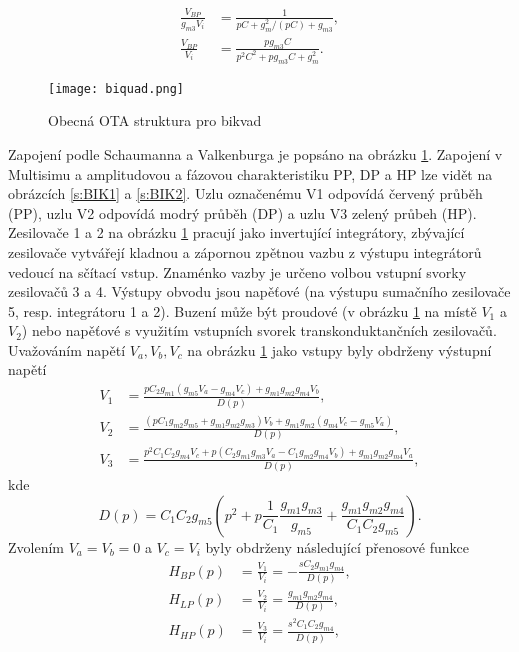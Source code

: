 \begin{align}
\frac{V_{BP}}{g_{m3}V_i} &= \frac{1}{pC + g_m^2/(pC) + g_{m3}},\\
\frac{V_{BP}}{V_i} &= \frac{pg_{m3}C}{p^2C^2 + pg_{m3}C + g_m^2}.
\end{align}
\begin{figure}[h]
\centering
\texttt{[image: biquad.png]}
\caption[Obecná OTA struktura pro bikvad]{Obecná OTA struktura pro bikvad \label{s:BIK}}
\end{figure}
\noindent Zapojení podle Schaumanna a Valkenburga \cite{18} je popsáno na obrázku \ref{s:BIK}. Zapojení v Multisimu a amplitudovou a fázovou charakteristiku PP, DP a HP lze vidět na obrázcích \ref{s:BIK1} a \ref{s:BIK2}. Uzlu označenému V1 odpovídá červený průběh (PP), uzlu V2 odpovídá modrý průběh (DP) a uzlu V3 zelený průbeh (HP). Zesilovače 1 a 2 na obrázku \ref{s:BIK} pracují jako invertující integrátory, zbývající zesilovače vytvářejí kladnou a zápornou zpětnou vazbu z výstupu integrátorů vedoucí na sčítací vstup. Znaménko vazby je určeno volbou vstupní svorky zesilovačů 3 a 4. Výstupy obvodu jsou napěťové (na výstupu sumačního zesilovače 5, resp. integrátoru 1 a 2). Buzení může být proudové (v obrázku \ref{s:BIK} na místě $V_1$ a $V_2$) nebo napěťové s využitím vstupních svorek transkonduktančních zesilovačů. Uvažováním napětí $V_a, V_b, V_c$ na obrázku \ref{s:BIK} jako vstupy byly obdrženy výstupní napětí
\begin{align}
V_1 &= \frac{pC_2g_{m1}(g_{m5}V_a - g_{m4}V_c) + g_{m1}g_{m2}g_{m4}V_b}{D(p)},\\
V_2 &= \frac{(pC_1g_{m2}g_{m5} + g_{m1}g_{m2}g_{m3})V_b + g_{m1}g_{m2}(g_{m4}V_c - g_{m5}V_a)}{D(p)},\\
V_3 &= \frac{p^2C_1C_2g_{m4}V_c + p(C_2g_{m1}g_{m3}V_a - C_1g_{m2}g_{m4}V_b) + g_{m1}g_{m2}g_{m4}V_a}{D(p)},
\end{align}\label{s:V3}
kde
\begin{equation}
D(p) = C_1C_2g_{m5}(p^2 + p\frac{1}{C_1}\frac{g_{m1}g_{m3}}{g_{m5}} + \frac{g_{m1}g_{m2}g_{m4}}{C_1C_2g_{m5}}).
\end{equation}\label{s:DS}
\noindent Zvolením $V_a = V_b = 0$ a $V_c = V_i$ byly obdrženy následující přenosové funkce
\begin{align}
H_{BP}(p) &= \frac{V_1}{V_i} = - \frac{sC_2g_{m1}g_{m4}}{D(p)},\\
H_{LP}(p) &= \frac{V_2}{V_i} = \frac{g_{m1}g_{m2}g_{m4}}{D(p)},\\
H_{HP}(p) &= \frac{V_3}{V_i} = \frac{s^2C_1C_2g_{m4}}{D(p)},
\end{align}
